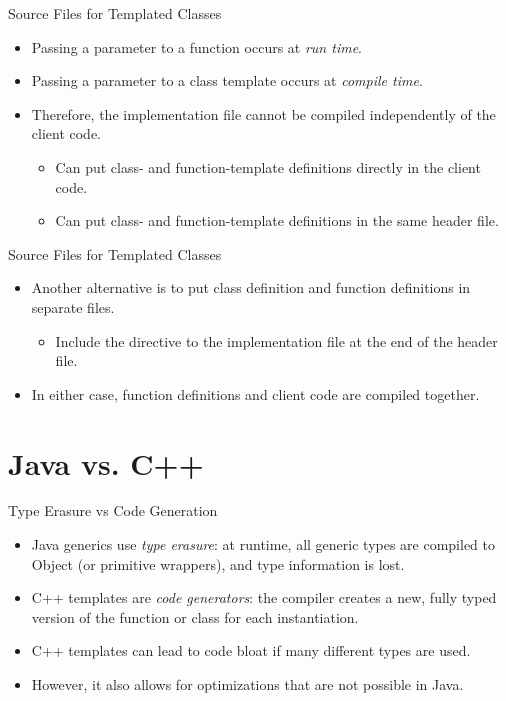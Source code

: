 \documentclass[14pt,aspectratio=1610, hyperref={pdfpagelayout=SinglePage}]{beamer}
\begin{document}
\begin{frame}{Source Files for Templated Classes}
\protect\hypertarget{header-file-and-implementation-file-of-a-class-template-1-of-2}{}
\begin{itemize}
\item
  Passing a parameter to a function occurs at \emph{run time}.
\item
  Passing a parameter to a class template occurs at \emph{compile time}.
\item
  Therefore, the implementation file cannot be compiled independently of the client
  code.
  \begin{itemize}
  \item
    Can put class- and function-template definitions
    directly in the client code.
  \item
    Can put class- and function-template definitions
    in the same header file.
  \end{itemize}
\end{itemize}
\end{frame}

\begin{frame}{Source Files for Templated Classes}
\protect\hypertarget{header-file-and-implementation-file-of-a-class-template-2-of-2}{}
\begin{itemize}
\item
  Another alternative is to put class definition and function
  definitions in separate files.
  \begin{itemize}
  \item
    Include the directive to the implementation file at the end of the header
    file.
  \end{itemize}
\item
  In either case, function definitions and client code are compiled
  together.
\end{itemize}
\end{frame}

\section{Java vs. C++}

\begin{frame}{Type Erasure vs Code Generation}
\begin{itemize}
\item
  Java generics use \emph{type erasure}: at runtime, all generic types are compiled to Object (or primitive wrappers), and type information is lost.
\item 
  C++ templates are \emph{code generators}: the compiler creates a new, fully typed version of the function or class for each instantiation.
\item
  C++ templates can lead to code bloat if many different types are used.
\item
  However, it also allows for optimizations that are not possible in Java.
\end{itemize}
\end{frame}
\end{document}

